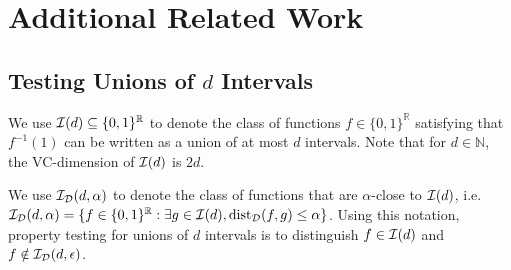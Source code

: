 \section{Additional Related Work}
\label{sec:preli}


\subsection{Testing Unions of $d$ Intervals}
\label{subsec:relatedinterval}
We use ${\mathcal{I}}(d)\subseteq\{0,1\}^{\mathbb{R}}$ to denote the class of functions $f\in\{0,1\}^{\mathbb{R}}$ satisfying that $f^{-1}(1)$ can be written as a union of at most $d$ intervals. Note that for $d\in\mathbb{N}$, the VC-dimension of ${\mathcal{I}}(d)$ is $2d$.

We use ${\mathcal{I}}_{{\mathcal{D}}}(d,\alpha)$ to denote the class of functions that are $\alpha$-close to ${\mathcal{I}}(d)$, i.e. ${\mathcal{I}}_{{\mathcal{D}}}(d,\alpha)=\{f\in\{0,1\}^{\mathbb{R}}:\exists g\in{\mathcal{I}}(d),{\mathrm{dist}}_{{\mathcal{D}}}(f,g)\leq\alpha\}$. Using this notation, property testing for unions of $d$ intervals is to distinguish $f\in{\mathcal{I}}(d)$ and $f\notin{\mathcal{I}}_{{\mathcal{D}}}(d,\epsilon)$. %

